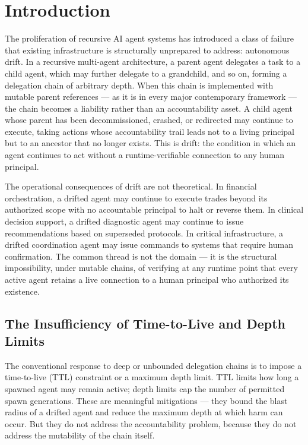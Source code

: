 \section{Introduction}
\label{sec:introduction}

The proliferation of recursive AI agent systems has introduced a class of failure that existing infrastructure is structurally unprepared to address: autonomous drift. In a recursive multi-agent architecture, a parent agent delegates a task to a child agent, which may further delegate to a grandchild, and so on, forming a delegation chain of arbitrary depth. When this chain is implemented with mutable parent references — as it is in every major contemporary framework — the chain becomes a liability rather than an accountability asset. A child agent whose parent has been decommissioned, crashed, or redirected may continue to execute, taking actions whose accountability trail leads not to a living principal but to an ancestor that no longer exists. This is drift: the condition in which an agent continues to act without a runtime-verifiable connection to any human principal.

The operational consequences of drift are not theoretical. In financial orchestration, a drifted agent may continue to execute trades beyond its authorized scope with no accountable principal to halt or reverse them. In clinical decision support, a drifted diagnostic agent may continue to issue recommendations based on superseded protocols. In critical infrastructure, a drifted coordination agent may issue commands to systems that require human confirmation. The common thread is not the domain — it is the structural impossibility, under mutable chains, of verifying at any runtime point that every active agent retains a live connection to a human principal who authorized its existence.

\subsection{The Insufficiency of Time-to-Live and Depth Limits}
\label{sec:ttl-insufficiency}

The conventional response to deep or unbounded delegation chains is to impose a time-to-live (TTL) constraint or a maximum depth limit. TTL limits how long a spawned agent may remain active; depth limits cap the number of permitted spawn generations. These are meaningful mitigations — they bound the blast radius of a drifted agent and reduce the maximum depth at which harm can occur. But they do not address the accountability problem, because they do not address the mutability of the chain itself.

